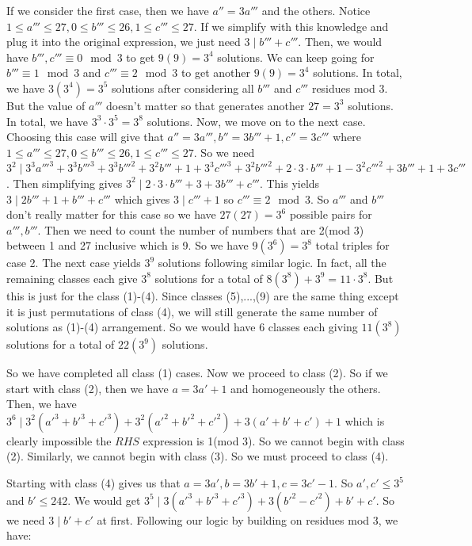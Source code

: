 \begin{enumerate}
 If we consider the first case, then we have $a'' = 3a'''$ and the others. Notice $1 \leq a''' \leq 27, 0 \leq b''' \leq 26, 1 \leq c''' \leq 27$. If we simplify with this knowledge and plug it into the original expression, we just need $3 \mid b''' + c'''$. Then, we would have $b''', c''' \equiv 0\mod 3$ to get $9(9) = 3^{4}$ solutions. We can keep going for $b''' \equiv 1\mod 3$ and $c''' \equiv 2\mod 3$ to get another $9(9) = 3^{4}$ solutions. In total, we have $3(3^{4}) = 3^{5}$ solutions after considering all $b'''$ and $c'''$ residues mod 3. But the value of $a'''$ doesn't matter so that generates another $27 = 3^{3}$ solutions. In total, we have $3^{3} \cdot 3^{5} = 3^{8}$ solutions. Now, we move on to the next case. Choosing this case will give that $a'' = 3a''', b'' = 3b''' + 1, c'' = 3c'''$ where $1 \leq a''' \leq 27, 0 \leq b''' \leq 26, 1 \leq c''' \leq 27$. So we need $3^{2} \mid 3^{3} a'''^{3} + 3^{3} b'''^{3} + 3^{3} b'''^{2} + 3^{2} b''' + 1 + 3^{3} c'''^{3} + 3^{2} b'''^{2} + 2 \cdot 3 \cdot b''' + 1 - 3^{2} c'''^{2} + 3b''' + 1 + 3c'''$. Then simplifying gives $3^{2} \mid 2 \cdot 3 \cdot b''' + 3 + 3b''' + c'''$. This yields $3 \mid 2b''' + 1 + b''' + c'''$ which gives $3 \mid c''' + 1$ so $c''' \equiv 2\mod 3$. So $a'''$ and $b'''$ don't really matter for this case so we have $27(27) = 3^{6}$ possible pairs for $a''', b'''$. Then we need to count the number of numbers that are 2(mod 3) between 1 and 27 inclusive which is 9. So we have $9(3^{6}) = 3^{8}$ total triples for case 2. The next case yields $3^{9}$ solutions following similar logic. In fact, all the remaining classes each give $3^{8}$ solutions for a total of $8(3^{8}) + 3^{9} = 11 \cdot 3^{8}$. But this is just for the class (1)-(4). Since classes (5),...,(9) are the same thing except it is just permutations of class (4), we will still generate the same number of solutions as (1)-(4) arrangement. So we would have $6$ classes each giving $11(3^{8})$ solutions for a total of $22(3^{9})$ solutions.

 So we have completed all class (1) cases. Now we proceed to class (2). So if we start with class (2), then we have $a = 3a' + 1$ and homogeneously the others. Then, we have $3^{6} \mid 3^{2}(a'^{3} + b'^{3} + c'^{3}) + 3^{2}(a'^{2} + b'^{2} + c'^{2}) + 3(a' + b' + c') + 1$ which is clearly impossible the $RHS$ expression is 1(mod 3). So we cannot begin with class (2). Similarly, we cannot begin with class (3). So we must proceed to class (4).

 Starting with class (4) gives us that $a = 3a', b = 3b' + 1, c = 3c' - 1$. So $a', c' \leq 3^{5}$ and $b' \leq 242$. We would get $3^{5} \mid 3(a'^{3} + b'^{3} + c'^{3}) + 3(b'^{2} - c'^{2}) + b' + c'$. So we need $3 \mid b' + c'$ at first. Following our logic by building on residues mod 3, we have:


\end{enumerate}
